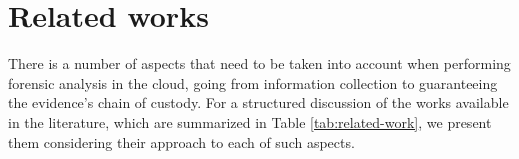 \documentclass[conference]{IEEEtran}
\newcommand{\marcos}[1]{{\color{green}{MARCOS: #1}}}
\begin{document}
%






\section{Related works}
\label{sec:related}


\marcos{TODO: Existem 4 critérios na sua tabela, mas apenas 3 deles são discutidos nas sub-seções: PRECISA DISCUTIR O 4o também!!! - Hamilton: Done}

There is a number of aspects that need to be taken into account when performing forensic analysis in the cloud, going from information collection to guaranteeing the evidence's chain of custody.
%
For a structured discussion of the works available in the literature, which are summarized in Table \ref{tab:related-work}, we present them considering their approach to each of such aspects.
\end{document}
